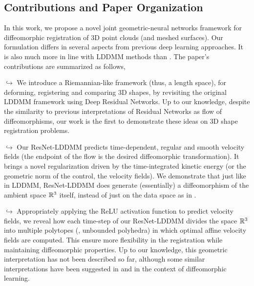 
\subsection{Contributions and Paper Organization}

In this work, we propose a novel joint geometric-neural networks framework for diffeomorphic registration of 3D point clouds (and meshed surfaces). Our formulation differs in several aspects from previous deep learning approaches. It is also much more in line with LDDMM methods than \cite{rousseau2020residual}. The paper's contributions are summarized as follows,

$\hookrightarrow$ We introduce a Riemannian-like framework (thus, a length space), for deforming, registering and comparing 3D shapes, by revisiting the original LDDMM framework using Deep Residual Networks. Up to our knowledge, despite the similarity to previous interpretations of Residual Networks as flow of diffeomorphisms, our work is the first to demonstrate these ideas on 3D shape registration problems.
    
$\hookrightarrow$ Our ResNet-LDDMM predicts time-dependent, regular and smooth velocity fields (the endpoint of the flow is the desired diffeomorphic transformation). It brings a novel regularization driven by the time-integrated kinetic energy (or the geometric norm of the control, \ie the velocity fields). We demonstrate that just like in LDDMM, ResNet-LDDMM does generate (essentially) a diffeomorphism of the ambient space $\mathbb{R}^3$ itself, instead of just on the data space as in \cite{rousseau2020residual}.
    
$\hookrightarrow$ Appropriately applying the ReLU activation function to predict velocity fields, we reveal how each time-step of our ResNet-LDDMM divides the space $\mathbb{R}^3$ into multiple polytopes (\ie, unbounded polyhedra) in which optimal affine velocity fields are computed. This ensure more flexibility in the registration while maintaining diffeomorphic properties. Up to our knowledge, this geometric interpretation has not been described so far, although some similar interpretations have been suggested in \cite{rousseau2020residual} and \cite{younes2019diffeomorphic} in the context of diffeomorphic learning. 

